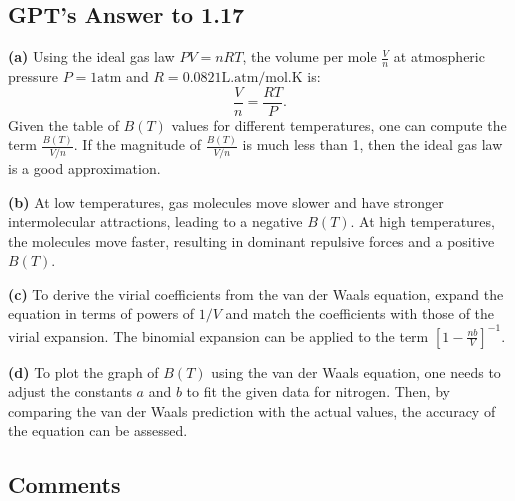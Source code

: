 \documentclass[12pt]{article}
\begin{document}
\subsection*{GPT's Answer to 1.17}

\textbf{(a)} Using the ideal gas law $PV = nRT$, the volume per mole $\frac{V}{n}$ at atmospheric pressure $P = 1 \text{atm}$ and $R = 0.0821 \text{L.atm/mol.K}$ is:
\begin{equation}
\frac{V}{n} = \frac{RT}{P}.
\end{equation}
Given the table of $B(T)$ values for different temperatures, one can compute the term $\frac{B(T)}{V/n}$. If the magnitude of $\frac{B(T)}{V/n}$ is much less than 1, then the ideal gas law is a good approximation.

\textbf{(b)} At low temperatures, gas molecules move slower and have stronger intermolecular attractions, leading to a negative $B(T)$. At high temperatures, the molecules move faster, resulting in dominant repulsive forces and a positive $B(T)$.

\textbf{(c)} To derive the virial coefficients from the van der Waals equation, expand the equation in terms of powers of $1/V$ and match the coefficients with those of the virial expansion. The binomial expansion can be applied to the term $\left[1-\frac{nb}{V}\right]^{-1}$.

\textbf{(d)} To plot the graph of $B(T)$ using the van der Waals equation, one needs to adjust the constants $a$ and $b$ to fit the given data for nitrogen. Then, by comparing the van der Waals prediction with the actual values, the accuracy of the equation can be assessed.

\subsection*{Comments}
\end{document}
